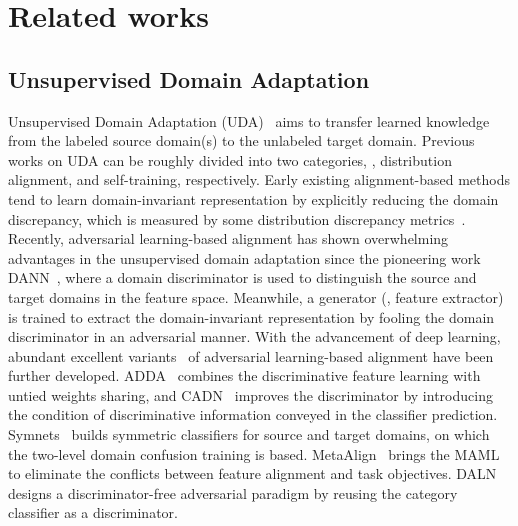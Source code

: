 \documentclass[journal]{IEEEtran}
\begin{document}
\section{Related works}
\label{sec:related work}
\subsection{Unsupervised Domain Adaptation}
Unsupervised Domain Adaptation (UDA)~\cite{ganin2016domain_dann,borgwardt2006integratingMMD,xu2021cdtransCDTrans,sun2022safeSSRT,deng2021joint,xu2021neutral,xu2022few,dai2021disentangling,lu2022styleam,liu2022source} aims to transfer learned knowledge from the labeled source domain(s) to the unlabeled target domain. Previous works on UDA 
can be roughly divided into two categories, \ieno, distribution alignment, and self-training, respectively. Early existing alignment-based methods tend to learn domain-invariant representation by explicitly reducing the domain discrepancy, which is measured by some distribution discrepancy metrics~\cite{borgwardt2006integratingMMD, zellinger2017centralCMD, sun2016returnCORAL, sun2016deepdeepcoral, peng2019momentM3SDA}. 
Recently, adversarial learning-based alignment has shown overwhelming advantages in the unsupervised domain adaptation since the pioneering work DANN~\cite{ganin2016domain_dann}, where a domain discriminator is used to distinguish the source and target domains in the feature space. Meanwhile, a generator (\ieno, feature extractor) is trained to extract the domain-invariant representation by fooling the domain discriminator in an adversarial manner. With the advancement of deep learning, abundant excellent variants~\cite{zhang2019domainSymnets, tzeng2017adversarialADDA, hoffman2018cycada, russo2018sourceSBADA, long2018conditionalCDAN, saito2018maximumMCD, xie2018learningMSTN, wang2019transferableTADA, wei2021toalign, chen2022reusingDALN, chen2019progressivePFAN, li2021biBCDM, luo2020unsupervised, chang2019domainDSBN} of adversarial learning-based alignment have been further developed. ADDA~\cite{tzeng2017adversarialADDA} 
combines the discriminative feature learning with untied weights sharing, and CADN~\cite{long2018conditionalCDAN} improves the discriminator by introducing the condition of discriminative information conveyed in the classifier prediction. Symnets~\cite{zhang2019domainSymnets} builds symmetric classifiers for source and target domains, on which the two-level domain confusion training is based. MetaAlign~\cite{wei2021metaalign} brings the MAML~\cite{finn2017modelMAML} to eliminate the conflicts between feature alignment and task objectives. DALN~\cite{chen2022reusingDALN} designs a discriminator-free adversarial paradigm by reusing the category classifier as a discriminator. 
\end{document}
